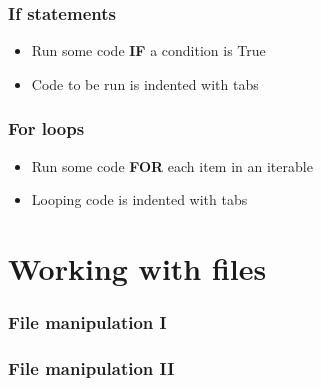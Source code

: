 \documentclass[]{beamer}
\begin{document}

\begin{frame}
\frametitle{If statements}

\begin{itemize}
\item Run some code \textbf{IF} a condition is True
\item Code to be run is indented with tabs
\end{itemize}

\begin{block}{}

\end{block}


\end{frame}

\begin{frame}
\frametitle{For loops}

\begin{itemize}
\item Run some code \textbf{FOR} each item in an iterable
\item Looping code is indented with tabs
\end{itemize}

\pause

\begin{block}{}

\end{block}

\end{frame}

\section{Working with files}


\begin{frame}
\frametitle{File manipulation I}

\begin{block}{}

\end{block}

\end{frame}


\begin{frame}
\frametitle{File manipulation II}


\begin{block}{}

\end{block}

\end{frame}
\end{document}
